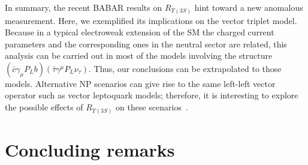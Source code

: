 \documentclass[reprint,showpacs,aps,prd,nofootinbib,superscriptaddress,longbibliography]{revtex4-1}
\begin{document}
In summary, the recent BABAR results on $R_{\Upsilon(3S)}$ hint toward a new anomalous measurement. Here, we exemplified its implications on the vector triplet model. Because in a typical electroweak extension of the SM the charged current parameters and the corresponding ones in the neutral sector are related, this analysis can be carried out in most of the models involving the structure $(\bar{c}\gamma_\mu P_L b)(\bar{\tau}\gamma^\mu P_L \nu_\tau)$. Thus, our conclusions can be extrapolated to those models. Alternative NP scenarios can give rise to the same left-left vector operator such as vector leptoquark models; therefore, it is interesting to explore the possible effects of $R_{\Upsilon(3S)}$ on these scenarios~\cite{Garcia:2021}.







\section{Concluding remarks} \label{Conclusion}
\end{document}
